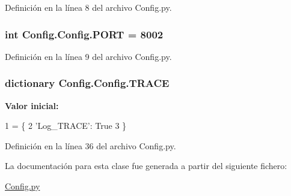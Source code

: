 Definición en la línea 8 del archivo Config.\-py.

\hypertarget{class_config_1_1_config_aef20c383d5c356bfc5771e132ad241df}{
\subsubsection[{P\-O\-R\-T}]{\setlength{\rightskip}{0pt plus 5cm}int Config.\-Config.\-P\-O\-R\-T = 8002\hspace{0.3cm}{\ttfamily [static]}}}\label{class_config_1_1_config_aef20c383d5c356bfc5771e132ad241df}


Definición en la línea 9 del archivo Config.\-py.

\hypertarget{class_config_1_1_config_aedf405e5fbfe131f86b5bde5de495fbc}{
\subsubsection[{T\-R\-A\-C\-E}]{\setlength{\rightskip}{0pt plus 5cm}dictionary Config.\-Config.\-T\-R\-A\-C\-E\hspace{0.3cm}{\ttfamily [static]}}}\label{class_config_1_1_config_aedf405e5fbfe131f86b5bde5de495fbc}
{\bfseries Valor inicial\-:}
\begin{DoxyCode}
1 = \{
2         \textcolor{stringliteral}{'Log\_TRACE'}: \textcolor{keyword}{True}
3     \}
\end{DoxyCode}


Definición en la línea 36 del archivo Config.\-py.



La documentación para esta clase fue generada a partir del siguiente fichero\-:\begin{DoxyCompactItemize}
\item 
\hyperlink{_config_8py}{Config.\-py}\end{DoxyCompactItemize}
